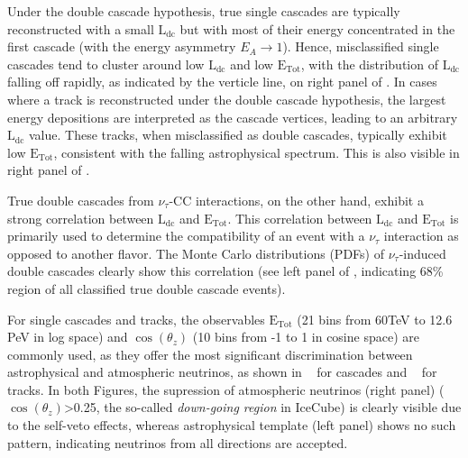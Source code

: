 Under the double cascade hypothesis, true single cascades are typically reconstructed with a small $\mathrm{L}_{\mathrm{dc}}$ but with most of their energy concentrated in the first cascade (with the energy asymmetry $E_A \rightarrow 1$). Hence, misclassified single cascades tend to cluster around low $\mathrm{L}_{\mathrm{dc}}$ and low $\mathrm{E}_{\mathrm{Tot}}$, with the distribution of $\mathrm{L}_{\mathrm{dc}}$ falling off rapidly, as indicated by the verticle line, on right panel of . In cases where a track is reconstructed under the double cascade hypothesis, the largest energy depositions are interpreted as the cascade vertices, leading to an arbitrary $\mathrm{L}_{\mathrm{dc}}$ value. These tracks, when misclassified as double cascades, typically exhibit low $\mathrm{E}_{\mathrm{Tot}}$, consistent with the falling astrophysical spectrum. This is also visible in right panel of .

True double cascades from $\nu_\tau$-CC interactions, on the other hand, exhibit a strong correlation between $\mathrm{L}_{\mathrm{dc}}$ and $\mathrm{E}_{\mathrm{Tot}}$. This correlation between $\mathrm{L}_{\mathrm{dc}}$ and $\mathrm{E}_{\mathrm{Tot}}$ is primarily used to determine the compatibility of an event with a $\nu_\tau$ interaction as opposed to another flavor. The Monte Carlo distributions (PDFs) of $\nu_\tau$-induced double cascades clearly show this correlation (see left panel of , indicating 68\% region of all classified true double cascade events). 

For single cascades and tracks, the observables $\mathrm{E}_{\mathrm{Tot}}$ (21 bins from 60TeV to 12.6 PeV in log space) and $\cos(\theta_z)$ (10 bins from -1 to 1 in cosine space) are commonly used, as they offer the most significant discrimination between astrophysical and atmospheric neutrinos, as shown in ~ for cascades and ~ for tracks. In both Figures, the supression of atmospheric neutrinos (right panel) ($\cos(\theta_z)$>0.25, the so-called \emph{down-going region} in IceCube) is clearly visible due to the self-veto effects, whereas astrophysical template (left panel) shows no such pattern, indicating neutrinos from all directions are accepted. 


